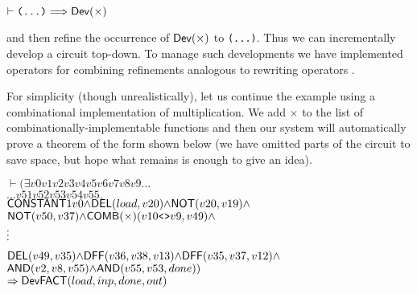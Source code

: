 \vspace*{-2mm}

{\baselineskip10pt\begin{alltt}
\( \vdash \texttt{(...)} \Longrightarrow \DEF{Dev}({\times}) \)
\end{alltt}}

\vspace*{-2mm}

\noindent and then refine the occurrence of $\mathsf{Dev}(\times)$
to \texttt{(...)}.  Thus we can incrementally develop a
circuit top-down. To manage such developments we have
implemented operators for combining refinements analogous to rewriting
operators \cite{paulson83}.

For simplicity (though unrealistically), let us continue the example
using a combinational implementation of multiplication. We add
${\times}$ to the list of combinationally-implementable functions and
then our system will automatically prove a theorem of the form shown
below (we have omitted parts of the circuit to save space, but hope
what remains is enough to give an idea).

\vspace*{-2mm}

{\baselineskip10pt\begin{alltt}
\( \vdash ({\exists}v0 v1 v2 v3 v4 v5 v6 v7 v8 v9 ...                                             \)
\(      ... v51 v52 v53 v54 v55.                                                                       \)
\(     \DEF{CONSTANT} 1 v0 {\wedge} \DEF{DEL}(load,v20) {\wedge} \DEF{NOT}(v20,v19) {\wedge}       \)
\(     \DEF{NOT}(v50,v37) {\wedge} \DEF{COMB}({\times})(v10\texttt{<>}v9,v49) {\wedge}                     \)
      \(\raisebox{3mm}{\vdots}\)
\(     \DEF{DEL}(v49,v35) {\wedge} \DEF{DFF}(v36,v38,v13) {\wedge} \DEF{DFF}(v35,v37,v12) {\wedge} \)
\(     \DEF{AND}(v2,v8,v55) {\wedge} \DEF{AND}(v55,v53,done))                                     \)
\(    \Rightarrow \DEF{Dev} \DEF{FACT} (load,inp,done,out)                                         \)
\end{alltt}}

\vspace*{-2mm}

